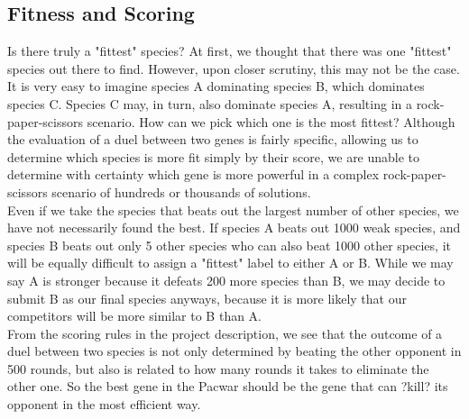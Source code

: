 \documentclass[twoside]{article}
\begin{document}
\begin{multicols}{2}
\subsection{Fitness and Scoring}
Is there truly a "fittest" species? At first, we thought that there was one "fittest" species out there to find. However, upon closer scrutiny, this may not be the case. It is very easy to imagine species A dominating species B, which dominates species C. Species C may, in turn, also dominate species A, resulting in a rock-paper-scissors scenario. How can we pick which one is the most fittest? Although the evaluation of a duel between two genes is fairly specific, allowing us to determine which species is more fit simply by their score, we are unable to determine with certainty which gene is more powerful in a complex rock-paper-scissors scenario of hundreds or thousands of solutions. 
\\\indent Even if we take the species that beats out the largest number of other species, we have not necessarily found the best. If species A beats out 1000 weak species, and species B beats out only 5 other species who can also beat 1000 other species, it will be equally difficult to assign a "fittest" label to either A or B. While we may say A is stronger because it defeats 200 more species than B, we may decide to submit B as our final species anyways, because it is more likely that our competitors will be more similar to B than A. 
\\\indent From the scoring rules in the project description, we see that the outcome of a duel between two species is not only determined by beating the other opponent in 500 rounds, but also is related to how many rounds it takes to eliminate the other one. So the best gene in the Pacwar should be the gene that can ?kill? its opponent in the most efficient way.

\end{multicols}
\end{document}
